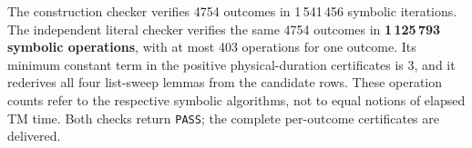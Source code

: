 The construction checker verifies 4754 outcomes in 1\,541\,456 symbolic
iterations. The independent literal checker verifies the same 4754 outcomes
in \textbf{1\,125\,793 symbolic operations}, with at most 403 operations for
one outcome. Its minimum constant term in the positive physical-duration
certificates is 3, and it rederives all four list-sweep lemmas from the
candidate rows. These operation counts refer to the respective symbolic
algorithms, not to equal notions of elapsed TM time. Both checks return
\texttt{PASS}; the complete per-outcome certificates are delivered.
